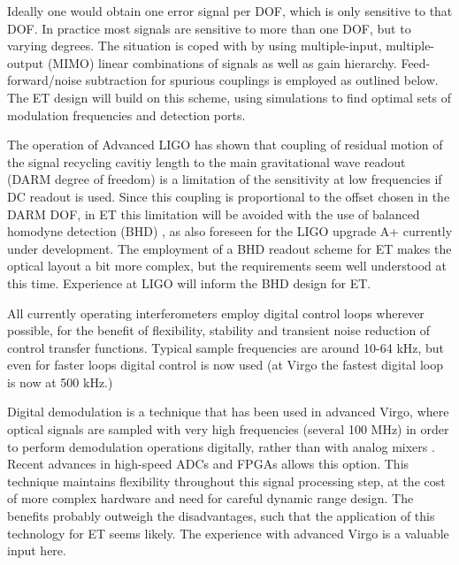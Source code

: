 Ideally one would obtain one error signal per DOF, which is only sensitive to that DOF. In practice most signals are sensitive to more than one DOF, but to varying degrees. 
The situation is coped with by using multiple-input, multiple-output (MIMO) linear combinations of signals 
as well as gain hierarchy. Feed-forward/noise subtraction for spurious couplings is employed as outlined below.
The ET design will build on this scheme, using simulations to find optimal sets of modulation frequencies and detection ports.

The operation of Advanced LIGO has shown that coupling of residual motion of the signal recycling cavitiy length to the main gravitational wave readout (DARM degree of freedom) is a limitation
of the sensitivity at low frequencies if DC readout is used. Since this coupling is proportional
to the offset chosen in the DARM DOF,
in ET this limitation will be avoided with the use of balanced homodyne detection (BHD) \cite{frit2014}, as also foreseen for the LIGO upgrade A+ currently under development.
The employment of a BHD readout scheme for ET makes the optical layout a bit more complex, but the requirements seem well understood at this time. Experience at LIGO will inform the BHD design for ET.


All currently operating interferometers employ digital control loops wherever possible, for the benefit of flexibility, stability and transient noise reduction of control transfer functions. Typical sample frequencies are around 10-64 kHz, but even for faster loops digital control is now used (at Virgo the fastest digital loop is now at 500 kHz.) 

Digital demodulation is a technique that has been used in advanced Virgo, where optical signals are sampled with very high frequencies (several 100 MHz) in order to perform demodulation operations digitally, rather than with analog mixers \cite{TheVirgo:2014hva}. Recent advances in high-speed ADCs and FPGAs allows this option. This technique maintains flexibility throughout this signal processing step, at the cost of more complex hardware and need for careful dynamic range design. The benefits probably outweigh the disadvantages, such that the application of this technology for ET seems likely. The experience with advanced Virgo is a valuable input here.



